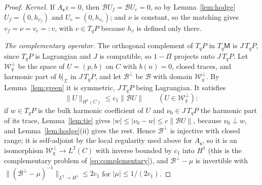 \documentclass[11pt]{amsart}
\theoremstyle{definition}
\theoremstyle{remark}
\theoremstyle{plain}
\numberwithin{equation}{section}
\newcommand{\Msf}{\mathsf{M}}
\begin{document}
\begin{proof}
\emph{Kernel.} If $A_{\mathfrak s} z=0$, then $\mathcal BU_f=\mathcal BU_c=0$, so by
Lemma~\ref{lem:hodge} $U_f=(0,h_{v_f})$ and $U_c=(0,h_{v_c})$; and $\nu$ is
constant, so the matching gives $v_f=\nu=v_c=:v$, with $v\in T_qP$ because
$h_v$ is defined only there.

\emph{The complementary operator.} The orthogonal complement of $T_qP$ in $T_q\Msf$ is
$J\,T_qP$, since $T_qP$ is Lagrangian and $J$ is compatible, so $1-\Pi$ projects onto
$J\,T_qP$. Let $\mathcal W^\perp_q$ be the space of $U=(p,b)$ on $C$ with $b(n)=0$,
closed traces, and harmonic part of $b|_\Sigma$ in $J\,T_qP$, and let
$\mathcal B^\perp$ be $\mathcal B$ with domain $\mathcal W^\perp_q$. By
Lemma~\ref{lem:green} it is symmetric, $J\,T_qP$ being Lagrangian. It satisfies
\begin{equation}\label{eq:complementary-perp}
\|U\|_{H^1(C)}\le c_1\|\mathcal BU\|\qquad(U\in\mathcal W^\perp_q):
\end{equation}
if $w\in T_qP$ is the bulk harmonic coefficient of $U$ and $\nu_0\in J\,T_qP$ the
harmonic part of its trace, Lemma~\ref{lem:tie} gives $|w|\le|\nu_0-w|\le
c\|\mathcal BU\|$, because $\nu_0\perp w$, and Lemma~\ref{lem:hodge}(ii) gives the rest.
Hence $\mathcal B^\perp$ is injective with closed range; it is self-adjoint by the local
regularity used above for $A_{\mathfrak s}$, so it is an isomorphism $\mathcal W^\perp_q\to
L^2(C)$ with inverse bounded by $c_1$ into $H^1$ (this is the complementary problem of
\eqref{eq:complementary}), and $\mathcal B^\perp-\mu$ is invertible with
$\|(\mathcal B^\perp-\mu)^{-1}\|_{L^2\to H^1}\le2c_1$ for $|\mu|\le1/(2c_1)$.


\end{proof}
\end{document}

